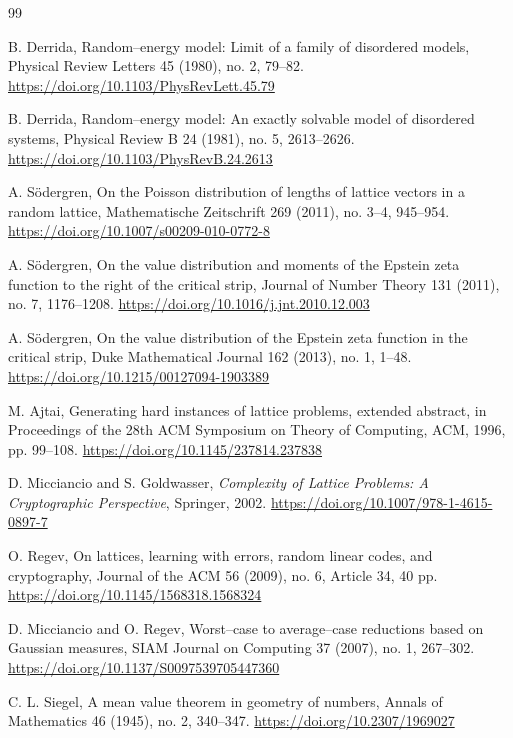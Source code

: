 \documentclass[a4paper,12pt]{article}
\theoremstyle{definition}
\theoremstyle{remark}
\begin{document}
\small
\begin{thebibliography}{99}

B. Derrida,
Random--energy model: Limit of a family of disordered models,
Physical Review Letters 45 (1980), no. 2, 79--82.
\url{https://doi.org/10.1103/PhysRevLett.45.79}

B. Derrida,
Random--energy model: An exactly solvable model of disordered systems,
Physical Review B 24 (1981), no. 5, 2613--2626.
\url{https://doi.org/10.1103/PhysRevB.24.2613}

A. S\"odergren,
On the Poisson distribution of lengths of lattice vectors in a random lattice,
Mathematische Zeitschrift 269 (2011), no. 3--4, 945--954.
\url{https://doi.org/10.1007/s00209-010-0772-8}

A. S\"odergren,
On the value distribution and moments of the Epstein zeta function to the right of the critical strip,
Journal of Number Theory 131 (2011), no. 7, 1176--1208.
\url{https://doi.org/10.1016/j.jnt.2010.12.003}

A. S\"odergren,
On the value distribution of the Epstein zeta function in the critical strip,
Duke Mathematical Journal 162 (2013), no. 1, 1--48.
\url{https://doi.org/10.1215/00127094-1903389}

M. Ajtai,
Generating hard instances of lattice problems,
extended abstract,
in Proceedings of the 28th ACM Symposium on Theory of Computing,
ACM, 1996, pp. 99--108.
\url{https://doi.org/10.1145/237814.237838}

D. Micciancio and S. Goldwasser,
{\em Complexity of Lattice Problems: A Cryptographic Perspective},
Springer, 2002.
\url{https://doi.org/10.1007/978-1-4615-0897-7}

O. Regev,
On lattices, learning with errors, random linear codes, and cryptography,
Journal of the ACM 56 (2009), no. 6, Article 34, 40 pp.
\url{https://doi.org/10.1145/1568318.1568324}

D. Micciancio and O. Regev,
Worst--case to average--case reductions based on Gaussian measures,
SIAM Journal on Computing 37 (2007), no. 1, 267--302.
\url{https://doi.org/10.1137/S0097539705447360}

C. L. Siegel,
A mean value theorem in geometry of numbers,
Annals of Mathematics 46 (1945), no. 2, 340--347.
\url{https://doi.org/10.2307/1969027}


\end{thebibliography}
\end{document}
